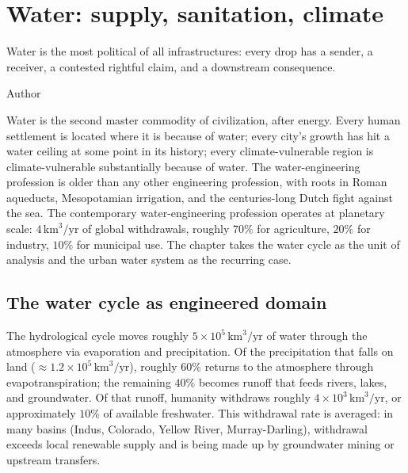 \chapter{Water: supply, sanitation, climate}
\label{vol12:ch03}

\epigraph{Water is the most political of all infrastructures: every drop has a sender, a receiver, a contested rightful claim, and a downstream consequence.}{Author}


\noindent
Water is the second master commodity of civilization, after energy. Every human settlement is located where it is because of water; every city's growth has hit a water ceiling at some point in its history; every climate-vulnerable region is climate-vulnerable substantially because of water. The water-engineering profession is older than any other engineering profession, with roots in Roman aqueducts, Mesopotamian irrigation, and the centuries-long Dutch fight against the sea. The contemporary water-engineering profession operates at planetary scale: $4\,\text{km}^3/\text{yr}$ of global withdrawals, roughly $70\%$ for agriculture, $20\%$ for industry, $10\%$ for municipal use. The chapter takes the water cycle as the unit of analysis and the urban water system as the recurring case.

\section{The water cycle as engineered domain}

The hydrological cycle moves roughly $5 \times 10^5\,\text{km}^3/\text{yr}$ of water through the atmosphere via evaporation and precipitation. Of the precipitation that falls on land ($\approx 1.2 \times 10^5\,\text{km}^3/\text{yr}$), roughly $60\%$ returns to the atmosphere through evapotranspiration; the remaining $40\%$ becomes runoff that feeds rivers, lakes, and groundwater. Of that runoff, humanity withdraws roughly $4 \times 10^3\,\text{km}^3/\text{yr}$, or approximately $10\%$ of available freshwater. This withdrawal rate is averaged: in many basins (Indus, Colorado, Yellow River, Murray-Darling), withdrawal exceeds local renewable supply and is being made up by groundwater mining or upstream transfers.

